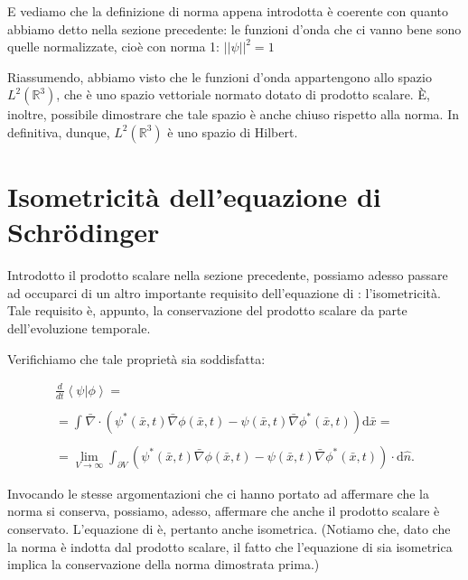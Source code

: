 E vediamo che la definizione di norma appena introdotta è coerente con quanto abbiamo detto nella sezione precedente: le funzioni d'onda che ci vanno bene sono quelle normalizzate, cioè con norma 1: $||\psi||^2=1$

Riassumendo, abbiamo visto che le funzioni d'onda appartengono allo spazio $L^2(\mathbb{R}^3)$, che è uno spazio vettoriale normato dotato di prodotto scalare. \`E, inoltre, possibile dimostrare che tale spazio è anche chiuso rispetto alla norma. In definitiva, dunque, $L^2(\mathbb{R}^3)$ è uno spazio di Hilbert.

\section[Isometricità]{Isometricità dell'equazione di Schrödinger} %
Introdotto il prodotto scalare nella sezione precedente, possiamo adesso passare ad occuparci di un altro importante requisito dell'equazione di \scha: l'isometricità. Tale requisito è, appunto, la conservazione del prodotto scalare da parte dell'evoluzione temporale.

Verifichiamo che tale proprietà sia soddisfatta:
 
\begin{equation}
\begin{array}{l}
\frac{d}{dt}\left \langle \psi |\phi  \right\rangle=\\ \\
=\int_{}^{}{\bar \nabla \cdot \left(\psi ^*\left(\bar x,t\right)\bar \nabla \phi \left(\bar x,t\right)-\psi \left(\bar x,t\right)\bar \nabla \phi ^*\left(\bar x,t\right)\right) \textrm{d}\bar x}=\\ \\
=\lim_{V\to \infty}{\int_{\partial V}^{}{\left(\psi ^*\left(\bar x,t\right)\bar \nabla \phi \left(\bar x,t\right)-\psi\left(\bar x,t\right) \bar \nabla \phi ^*\left(\bar x,t\right)\right) \cdot \textrm{d}\hat n}}.
\end{array}
\end{equation}

Invocando le stesse argomentazioni che ci hanno portato ad affermare che la norma si conserva, possiamo, adesso, affermare che anche il prodotto scalare è conservato. L'equazione di \sch è, pertanto anche isometrica.
(Notiamo che, dato che la norma è indotta dal prodotto scalare, il fatto che l'equazione di \sch sia isometrica implica la conservazione della norma dimostrata prima.)

